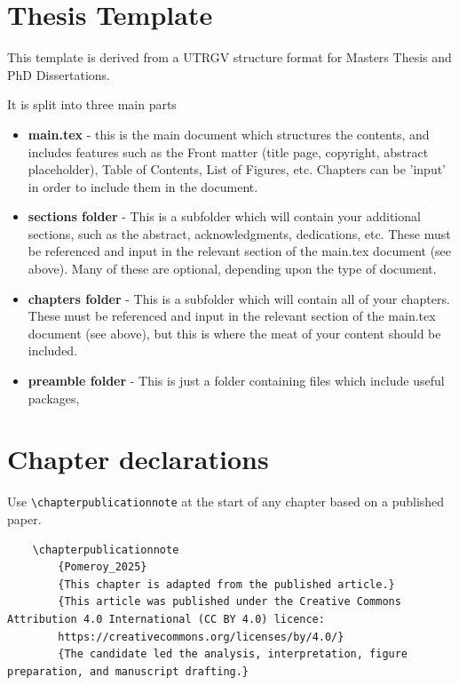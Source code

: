 \section{Thesis Template}

This template is derived from a UTRGV structure format for Masters Thesis and PhD Dissertations.

It is split into three main parts
\begin{itemize}
    \item \textbf{main.tex} - this is the main document which structures the contents, and includes features such as the Front matter (title page, copyright, abstract placeholder), Table of Contents, List of Figures, etc. Chapters can be 'input' in order to include them in the document.
    \item \textbf{sections folder} - This is a subfolder which will contain your additional sections, such as the abstract, acknowledgments, dedications, etc. These must be referenced and input in the relevant section of the main.tex document (see above). Many of these are optional, depending upon the type of document.
    \item \textbf{chapters folder} - This is a subfolder which will contain all of your chapters. These must be referenced and input in the relevant section of the main.tex document (see above), but this is where the meat of your content should be included.
    \item \textbf{preamble folder} - This is just a folder containing files which include useful packages,
\end{itemize}

\section{Chapter declarations}
Use \verb|\chapterpublicationnote| at the start of any chapter based on a published paper.
    \eg 
    \begin{verbatim}
    \chapterpublicationnote
        {Pomeroy_2025}
        {This chapter is adapted from the published article.}
        {This article was published under the Creative Commons Attribution 4.0 International (CC BY 4.0) licence:
        https://creativecommons.org/licenses/by/4.0/}
        {The candidate led the analysis, interpretation, figure preparation, and manuscript drafting.}
    \end{verbatim}